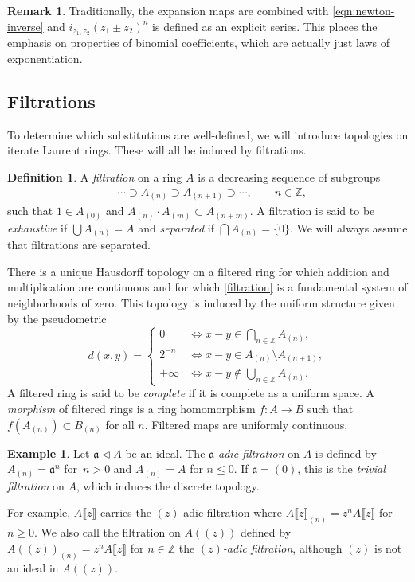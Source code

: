 \documentclass[10pt,a4paper]{amsart}
\numberwithin{equation}{section}
\theoremstyle{definition}
\newtheorem{Definition}[Theorem]{Definition}
\newtheorem{Example}[Theorem]{Example}
\newtheorem{Remark}[Theorem]{Remark}
\def\lb{\llbracket}
\def\rb{\rrbracket}
\begin{document}
\begin{Remark}
 Traditionally, the expansion maps are combined with \eqref{eqn:newton-inverse} and $i_{z_1,z_2}(z_1\pm z_2)^n$ is defined as an explicit series. This places the emphasis on properties of binomial coefficients, which are actually just laws of exponentiation.
\end{Remark}

\subsection{Filtrations}\label{s33}

 To determine which substitutions are well-defined, we will introduce topologies on iterate Laurent rings. These will all be induced by filtrations.

\begin{Definition}
A \emph{filtration} on a ring $A$ is a decreasing sequence of subgroups
\begin{align}\label{filtration}
&\cdots\supset A_{(n)}\supset A_{(n+1)}\supset\cdots,\qquad n\in\mathbb{Z},
\end{align}
such that $1\in A_{(0)}$ and $A_{(n)}\cdot A_{(m)}\subset A_{(n+m)}$. A filtration is said to be \emph{exhaustive} if $\bigcup A_{(n)}=A$ and \emph{separated} if $\bigcap A_{(n)}=\{0\}$. We will always assume that filtrations are separated.
\end{Definition}

 There is a unique Hausdorff topology on a filtered ring for which addition and multiplication are continuous and for which \eqref{filtration} is a fundamental system of neighborhoods of zero. This topology is induced by the uniform structure given by the pseudometric
\[
 d(x,y)=
 \begin{cases}
 0 & {\iff} x-y\in\bigcap_{n\in\mathbb{Z}} A_{(n)},\\
 2^{-n} & {\iff} x-y \in A_{(n)}\setminus A_{(n+1)},\\
 +\infty & {\iff} x-y \notin\bigcup_{n\in\mathbb{Z}} A_{(n)}.
 \end{cases}
\]
A filtered ring is said to be \emph{complete} if it is complete as a uniform space. A \emph{morphism} of filtered rings is a ring homomorphism $f\colon A\to B$ such that $f(A_{(n)})\subset B_{(n)}$ for all $n$. Filtered maps are uniformly continuous.


\begin{Example}
 Let $\mathfrak{a}\triangleleft A$ be an ideal. The \emph{$\mathfrak{a}$-adic filtration} on $A$ is defined by $A_{(n)}=\mathfrak{a}^n$ for~${n>0}$ and $A_{(n)}=A$ for $n\leqslant0$. If $\mathfrak{a}=(0)$, this is the \emph{trivial filtration} on $A$, which induces the discrete topology.

 For example, $A\lb z\rb$ carries the $(z)$-adic filtration where $A\lb z\rb_{(n)}=z^nA\lb z\rb$ for $n\geqslant0$. We also call the filtration on $A(\!( z)\!)$ defined by $A(\!( z)\!)_{(n)}=z^nA\lb z\rb$ for $n\in\mathbb{Z}$ the \emph{$(z)$-adic filtration}, although $(z)$ is not an ideal in $A(\!( z)\!)$.
\end{Example}
\end{document}
